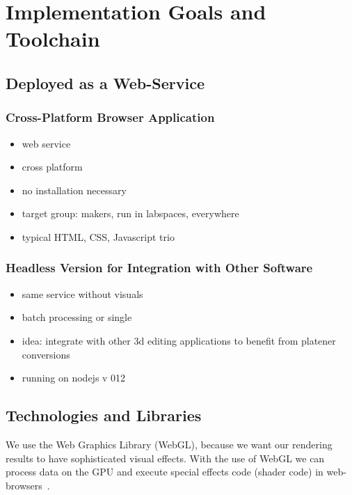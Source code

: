 \documentclass[../ClassicThesis.tex]{subfiles}
\begin{document}
\chapter{Implementation Goals and Toolchain}\label{ch:toolchain}

\newcommand\myNotes[1]{\textcolor{red}{#1}}

\section{Deployed as a Web-Service}

\subsection{Cross-Platform Browser Application}

\begin{itemize}
\item web service
\item cross platform
\item no installation necessary
\item target group: makers, run in labspaces, everywhere
\item typical HTML, CSS, Javascript trio
\end{itemize}

\subsection{Headless Version for Integration with Other Software}

\begin{itemize}
\item same service without visuals
\item batch processing or single
\item idea: integrate with other 3d editing applications to benefit
  from platener conversions
\item running on nodejs v 012
\end{itemize}

\section{Technologies and Libraries}


We use the Web Graphics Library (WebGL), because we want our
rendering results to have sophisticated visual effects. With
the use of WebGL we can process data on the GPU and execute
special effects code (shader code) in
web-browsers~\cite{mdn-webgl}.
\end{document}
